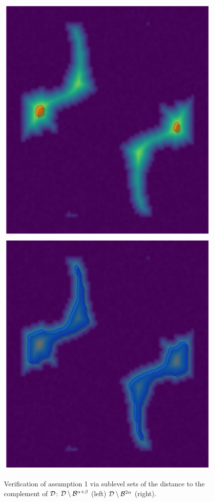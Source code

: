 \begin{figure}[htbp]
\centering
    \includegraphics[scale=0.8]{figures/hsn_size_1.pdf}\hspace{0.5in}
    \includegraphics[scale=0.8]{figures/hsn_size_2.pdf}
    \caption{Verification of assumption 1 via sublevel sets of the distance to the complement of ${\mathcal{D}}$:
            ${\mathcal{D}}\setminus{\mathcal{B}}^{\alpha+\beta}$ (left) ${\mathcal{D}}\setminus{\mathcal{B}}^{2\alpha}$ (right).}
    \label{fig:hsn_size}
\end{figure}

